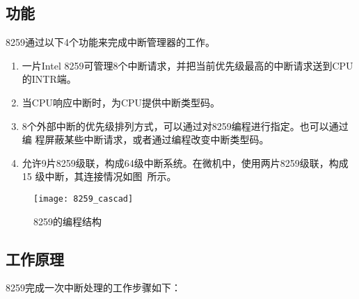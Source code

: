 \subsection{功能}
\label{subsec:8259_function}

8259通过以下4个功能来完成中断管理器的工作。

\begin{enumerate}[(1)]
	\item 一片Intel 8259可管理8个中断请求，并把当前优先级最高的中断请求送到CPU
	的INTR端。
	\item 当CPU响应中断时，为CPU提供中断类型码。
	\item 8个外部中断的优先级排列方式，可以通过对8259编程进行指定。也可以通过编
	程屏蔽某些中断请求，或者通过编程改变中断类型码。
	\item 允许9片8259级联，构成64级中断系统。在微机中，使用两片8259级联，构成15
	级中断，其连接情况如图~所示。
\end{enumerate}

\begin{figure}[H]
	\centering
	\texttt{[image: 8259\_cascad]}
	\caption{8259的编程结构}
	\label{fig:8259_cascad}
\end{figure}

\subsection{工作原理}
\label{subsec:8259_work}

8259完成一次中断处理的工作步骤如下：

